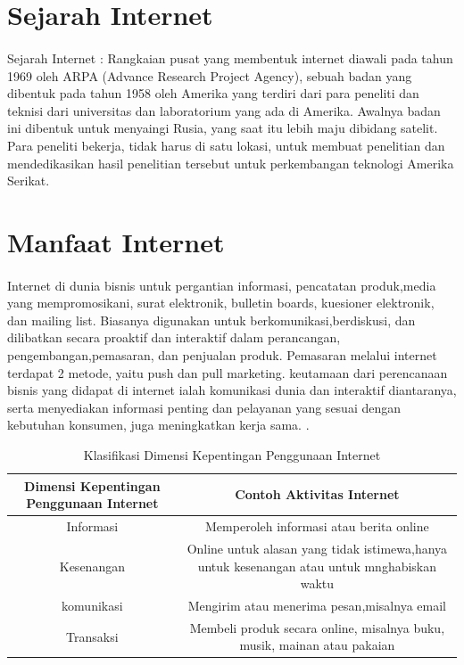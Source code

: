 \section{Sejarah Internet}
\paragraph{} Sejarah Internet : Rangkaian pusat yang membentuk internet diawali pada tahun 1969 oleh ARPA (Advance Research Project Agency), sebuah badan yang dibentuk pada tahun 1958 oleh Amerika yang terdiri dari para peneliti dan teknisi dari universitas dan laboratorium yang ada di Amerika. Awalnya badan ini dibentuk untuk menyaingi Rusia, yang saat itu lebih maju dibidang satelit. Para peneliti bekerja, tidak harus di satu lokasi, untuk membuat penelitian dan mendedikasikan hasil penelitian tersebut untuk perkembangan teknologi Amerika Serikat.

\section{Manfaat Internet}
\paragraph{} Internet di dunia bisnis untuk pergantian informasi, pencatatan produk,media yang mempromosikani, surat elektronik, bulletin boards, kuesioner elektronik, dan mailing list. Biasanya digunakan untuk berkomunikasi,berdiskusi, dan dilibatkan secara proaktif dan interaktif dalam perancangan, pengembangan,pemasaran, dan penjualan produk. Pemasaran melalui internet terdapat 2 metode, yaitu push dan pull marketing. keutamaan dari perencanaan bisnis yang didapat di internet ialah komunikasi dunia dan interaktif diantaranya, serta menyediakan informasi penting dan pelayanan yang sesuai dengan kebutuhan konsumen, juga meningkatkan kerja sama.
\cite{yuliana2004penggunaan}.

\begin{table}[h]
\caption{Klasifikasi Dimensi Kepentingan Penggunaan Internet}
\centering
\begin{tabular}{|c|c|}
\hline
Dimensi Kepentingan Penggunaan Internet&Contoh Aktivitas Internet\\
\hline
Informasi&Memperoleh informasi atau berita online\\
Kesenangan&Online untuk alasan yang tidak istimewa,hanya untuk kesenangan atau untuk mnghabiskan waktu\\
komunikasi&Mengirim atau menerima pesan,misalnya email\\
Transaksi&Membeli produk secara online, misalnya buku, musik, mainan atau pakaian\\
\hline
\end{tabular}
\label{table:contoh}
\end{table}

